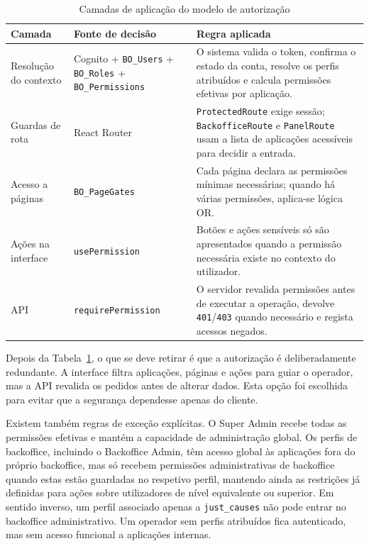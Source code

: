\begin{table}[H]
\caption{Camadas de aplicação do modelo de autorização}
\label{tab:camadas_autorizacao}
\begin{center}
\small
\begin{tabular}{|p{3cm}|p{3.4cm}|p{7cm}|}
\hline
\textbf{Camada} & \textbf{Fonte de decisão} & \textbf{Regra aplicada} \\ \hline
Resolução do contexto & Cognito + \texttt{BO\_Users} + \texttt{BO\_Roles} + \texttt{BO\_Permissions} & O sistema valida o token, confirma o estado da conta, resolve os perfis atribuídos e calcula permissões efetivas por aplicação. \\ \hline
Guardas de rota & React Router & \texttt{ProtectedRoute} exige sessão; \texttt{BackofficeRoute} e \texttt{PanelRoute} usam a lista de aplicações acessíveis para decidir a entrada. \\ \hline
Acesso a páginas & \texttt{BO\_PageGates} & Cada página declara as permissões mínimas necessárias; quando há várias permissões, aplica-se lógica OR. \\ \hline
Ações na interface & \texttt{usePermission} & Botões e ações sensíveis só são apresentados quando a permissão necessária existe no contexto do utilizador. \\ \hline
\gls{API} & \texttt{requirePermission} & O servidor revalida permissões antes de executar a operação, devolve \texttt{401}/\texttt{403} quando necessário e regista acessos negados. \\ \hline
\end{tabular}
\end{center}
\end{table}

Depois da Tabela~\ref{tab:camadas_autorizacao}, o que se deve retirar é que a autorização é deliberadamente redundante. A interface filtra aplicações, páginas e ações para guiar o operador, mas a \gls{API} revalida os pedidos antes de alterar dados. Esta opção foi escolhida para evitar que a segurança dependesse apenas do cliente.

Existem também regras de exceção explícitas. O Super Admin recebe todas as permissões efetivas e mantém a capacidade de administração global. Os perfis de backoffice, incluindo o Backoffice Admin, têm acesso global às aplicações fora do próprio backoffice, mas só recebem permissões administrativas de backoffice quando estas estão guardadas no respetivo perfil, mantendo ainda as restrições já definidas para ações sobre utilizadores de nível equivalente ou superior. Em sentido inverso, um perfil associado apenas a \texttt{just\_causes} não pode entrar no backoffice administrativo. Um operador sem perfis atribuídos fica autenticado, mas sem acesso funcional a aplicações internas.

